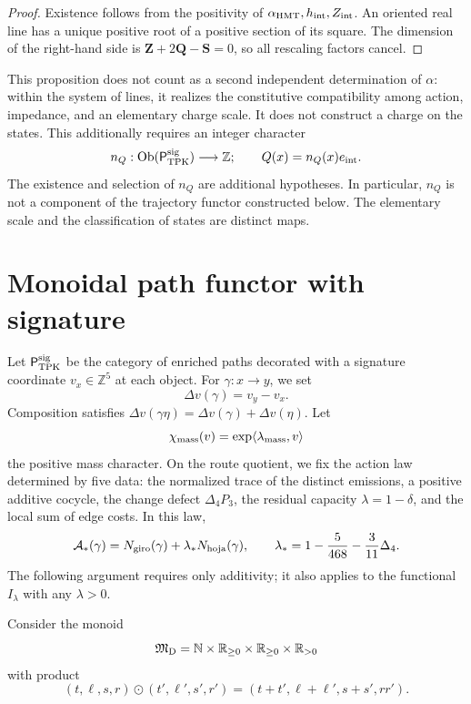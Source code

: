 \begin{proof}
Existence follows from the positivity of
\(\alpha_{\rm HMT},h_{\rm int},Z_{\rm int}\). An oriented real line
has a unique positive root of a positive section of its square. The
dimension of the right-hand side is
\(\mathbf Z+2\mathbf Q-\mathbf S=0\), so all rescaling factors
cancel.
\end{proof}

This proposition does not count as a second independent determination of
\(\alpha\): within the system of lines, it realizes the constitutive
compatibility among action, impedance, and an elementary charge scale. It does not
construct a charge on the states. This additionally requires an
integer character
\[
 n_Q:\operatorname{Ob}(\mathsf P_{\rm TPK}^{\rm sig})\longrightarrow
 \mathbb Z;
 \qquad
 Q(x)=n_Q(x)e_{\rm int}.
\]
The existence and selection of \(n_Q\) are additional hypotheses. In
particular, \(n_Q\) is not a component of the trajectory functor
constructed below. The elementary scale and the classification of states
are distinct maps.

\section{Monoidal path functor with signature}

Let \(\mathsf P_{\rm TPK}^{\rm sig}\) be the category of enriched
paths decorated with a signature coordinate
\(v_x\in\mathbb Z^5\) at each object. For
\(\gamma:x\to y\), we set
\[
 \Delta v(\gamma)=v_y-v_x.
\]
Composition satisfies
\(\Delta v(\gamma\eta)=\Delta v(\gamma)+\Delta v(\eta)\).
Let
\[
 \chi_{\rm mass}(v)=\exp\langle\lambda_{\rm mass},v\rangle
\]
the positive mass character. On the route quotient, we fix the
action law determined by five data: the normalized trace of the distinct
emissions, a positive additive cocycle, the change defect
\(\Delta_4P_3\), the residual capacity \(\lambda=1-\delta\), and the local sum
of edge costs. In this law,
\[
 \mathcal A_*(\gamma)
 =N_{\rm giro}(\gamma)+\lambda_*N_{\rm hoja}(\gamma),
 \qquad
 \lambda_*=1-\frac5{468}-\frac3{11}\Delta_4.
\]
The following argument requires only additivity; it also applies to the
functional \(I_\lambda\) with any \(\lambda>0\).

Consider the monoid
\[
 \mathfrak M_{\rm D}
 =\mathbb N\times\mathbb R_{\ge0}\times
  \mathbb R_{\ge0}\times\mathbb R_{>0}
\]
with product
\[
 (t,\ell,s,r)\odot(t',\ell',s',r')
 =(t+t',\ell+\ell',s+s',rr').
\]

